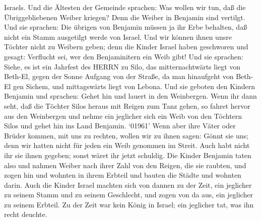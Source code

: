Israels.  Und die Ältesten der Gemeinde sprachen: Was
wollen wir tun, daß die Übriggebliebenen Weiber kriegen? Denn die Weiber
in Benjamin sind vertilgt.  Und sie sprachen: Die übrigen
von Benjamin müssen ja ihr Erbe behalten, daß nicht ein Stamm ausgetilgt
werde von Israel.  Und wir können ihnen unsre Töchter nicht
zu Weibern geben; denn die Kinder Israel haben geschworen und gesagt:
Verflucht sei, wer den Benjaminitern ein Weib gibt!  Und
sie sprachen: Siehe, es ist ein Jahrfest des HERRN zu Silo, das
mitternachtwärts liegt von Beth-El, gegen der Sonne Aufgang von der
Straße, da man hinaufgeht von Beth-El gen Sichem, und mittagswärts liegt
von Lebona.  Und sie geboten den Kindern Benjamin und
sprachen: Gehet hin und lauert in den Weinbergen.  Wenn ihr
dann seht, daß die Töchter Silos heraus mit Reigen zum Tanz gehen, so
fahret hervor aus den Weinbergen und nehme ein jeglicher sich ein Weib
von den Töchtern Silos und gehet hin ins Land Benjamin. 
`01961' Wenn aber ihre Väter oder Brüder kommen, mit uns zu rechten,
wollen wir zu ihnen sagen: Gönnt sie uns; denn wir hatten nicht für
jeden ein Weib genommen im Streit. Auch habt nicht ihr sie ihnen
gegeben; sonst wäret ihr jetzt schuldig.  Die Kinder
Benjamin taten also und nahmen Weiber nach ihrer Zahl von den Reigen,
die sie raubten, und zogen hin und wohnten in ihrem Erbteil und bauten
die Städte und wohnten darin.  Auch die Kinder Israel
machten sich von dannen zu der Zeit, ein jeglicher zu seinem Stamm und
zu seinem Geschlecht, und zogen von da aus, ein jeglicher zu seinem
Erbteil.  Zu der Zeit war kein König in Israel; ein
jeglicher tat, was ihn recht deuchte.
